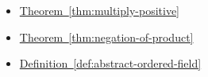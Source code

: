 \begin{dependencies}
\begin{itemize}
  \item \hyperref[thm:multiply-positive]{Theorem~\ref*{thm:multiply-positive}}
  \item \hyperref[thm:negation-of-product]{Theorem~\ref*{thm:negation-of-product}}
  \item \hyperref[def:abstract-ordered-field]{Definition~\ref*{def:abstract-ordered-field}}
\end{itemize}
\end{dependencies}

\clearpage
